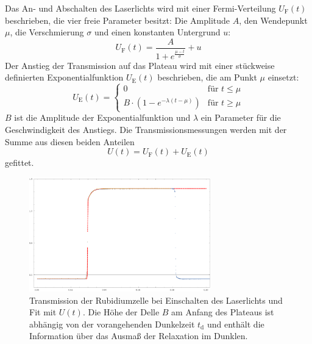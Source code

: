 Das An- und Abschalten des Laserlichts wird mit einer Fermi-Verteilung $U_{\text{F}}(t)$ beschrieben,
die vier freie Parameter besitzt:
Die Amplitude $A$, den Wendepunkt $\mu$, die Verschmierung $\sigma$ und einen konstanten Untergrund $u$:
\begin{equation}
  U_{\text{F}}(t)=\frac{A}{1+e^{\frac{\mu - t}{\sigma}}} + u
\end{equation}
Der Anstieg der Transmission auf das Plateau wird mit einer
stückweise definierten Exponentialfunktion $U_{\text{E}}(t)$
beschrieben, die am Punkt $\mu$ einsetzt:
\begin{equation}
  U_{\text{E}}(t)=
  \begin{cases}
  0	& \text{für } t \leq \mu \\
  B \cdot \left( 1-e^{-\lambda(t-\mu)} \right)  & \text{für } t \geq \mu
  \end{cases}
\end{equation}
$B$ ist die Amplitude der Exponentialfunktion und $\lambda$ ein Parameter für die Geschwindigkeit des Anstiegs.
Die Transmissionsmessungen werden mit der Summe aus diesen beiden Anteilen
\begin{equation}
\label{eq:fra:fitfunct}
   U(t)= U_{\text{F}}(t)+ U_{\text{E}}(t)
\end{equation}
gefittet.


\begin{figure}[H]
\begin{center}
  \includegraphics[width=0.7\textwidth]{../img/part6/exampletrans.pdf}
  \caption{Transmission der Rubidiumzelle bei Einschalten des Laserlichts und Fit mit $U(t)$.
  Die Höhe der Delle $B$ am Anfang des Plateaus ist abhängig von der vorangehenden Dunkelzeit $t_\text{d}$
  und enthält die Information über das Ausmaß der Relaxation im Dunklen.}
  \label{img:fra:exampletrans}
\end{center}
\end{figure}

